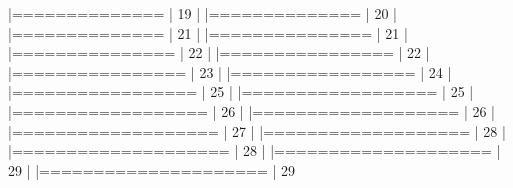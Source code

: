 \documentclass{article}
\begin{document}
\begin{Schunk}
\begin{Soutput}
  |==============                                                        |  19%
  |                                                                            
  |==============                                                        |  20%
  |                                                                            
  |==============                                                        |  21%
  |                                                                            
  |===============                                                       |  21%
  |                                                                            
  |===============                                                       |  22%
  |                                                                            
  |================                                                      |  22%
  |                                                                            
  |================                                                      |  23%
  |                                                                            
  |=================                                                     |  24%
  |                                                                            
  |=================                                                     |  25%
  |                                                                            
  |==================                                                    |  25%
  |                                                                            
  |==================                                                    |  26%
  |                                                                            
  |===================                                                   |  26%
  |                                                                            
  |===================                                                   |  27%
  |                                                                            
  |===================                                                   |  28%
  |                                                                            
  |====================                                                  |  28%
  |                                                                            
  |====================                                                  |  29%
  |                                                                            
  |=====================                                                 |  29%

\end{Soutput}
\end{Schunk}
\end{document}
